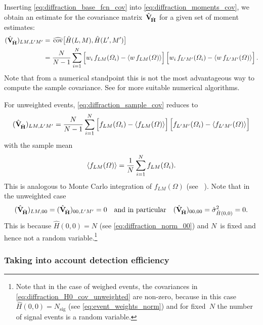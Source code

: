Inserting \cref{eq:diffraction_base_fcn_cov} into
\cref{eq:diffraction_moments_cov}, we obtain an estimate for the
covariance matrix~$\hat{\bm{\mathrm{V}}}_{\!\hat{\bm{\mathrm{H}}}}$ for a given set
of moment estimates:
\begin{align}
  (\covMatEstSym_{\!\hat{\vect{H}}})_{L M, L' M'}
  ={}& \covEst[1]{\hat{H}(L, M), \hat{H}(L', M')} \nonumber
  \\
  \label{eq:diffraction_sample_cov}
  ={}& \frac{N}{N - 1} \sum_{i = 1}^N
  \sBrk[2]{w_i\, f_{L M}(\Omega_i) - \mean{w\, f_{L M}(\Omega)}} \sBrk[2]{w_i\, f_{L' M'}(\Omega_i) - \mean{w\, f_{L' M'}(\Omega)}}.
\end{align}
Note that from a numerical standpoint this is not the most
advantageous way to compute the sample covariance.  See
 for more suitable numerical
algorithms.

For unweighted events, \cref{eq:diffraction_sample_cov} reduces to
\begin{equation}
  (\covMatEstSym_{\!\hat{\vect{H}}})_{L M, L' M'}
  = \frac{N}{N - 1} \sum_{i = 1}^N \sBrk[2]{f_{L M}(\Omega_i) - \mean{f_{L M}(\Omega)}} \sBrk[2]{f_{L' M'}(\Omega_i) - \mean{f_{L' M'}(\Omega)}}
\end{equation}
with the sample mean
\begin{equation}
  \mean{f_{L M}(\Omega)}
  = \frac{1}{N} \sum_{i = 1}^N f_{L M}(\Omega_i).
\end{equation}
This is analogous to Monte Carlo integration of $f_{L M}(\Omega)$ (see
\eg\ ).  Note that in the
unweighted case
\begin{equation}
  \label{eq:diffraction_H0_cov_unweighted}
  (\hat{\bm{\mathrm{V}}}_{\!\hat{\bm{\mathrm{H}}}})_{L M, 0 0}
  = (\hat{\bm{\mathrm{V}}}_{\!\hat{\bm{\mathrm{H}}}})_{0 0, L' M'}
  = 0
  \quad\text{and in particular}\quad
  (\hat{\bm{\mathrm{V}}}_{\!\hat{\bm{\mathrm{H}}}})_{0 0, 0 0}
  = \hat{\sigma}^2_{\hat{H}(0, 0)}
  = 0.
\end{equation}
This is because $\hat{H}(0, 0) = N$ (see \cref{eq:diffraction_norm_00})
and $N$~is fixed and hence not a random variable.\footnote{Note that
in the case of weighed events, the covariances in
\cref{eq:diffraction_H0_cov_unweighted} are non-zero, because in this
case $\hat{H}(0, 0) = N_\text{sig}$ (see \cref{eq:event_weights_norm})
and for fixed~$N$ the number of signal events is a random variable.}


\subsubsection{Taking into account detection efficiency}%
\label{sec:diffraction:acceptance_corr}

